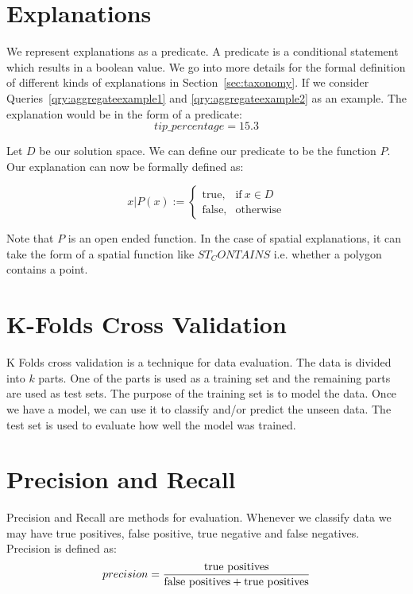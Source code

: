 \section{Explanations}
We represent explanations as a predicate. A predicate is a conditional statement which results in a boolean value. We go into more details for the formal definition of different kinds of explanations in Section~\ref{sec:taxonomy}. If we consider Queries~\ref{qry:aggregateexample1} and \ref{qry:aggregateexample2} as an example. The explanation would be in the form of a predicate:
$$tip\_percentage = 15.3$$

Let $D$ be our solution space. We can define our predicate to be the function $P$. Our explanation can now be formally defined as:

\begin{equation}
x|P(x):=
    \begin{cases}
      \text{true}, & \text{if}\ x \in D \\
      \text{false}, & \text{otherwise}
    \end{cases}
\end{equation}

Note that $P$ is an open ended function. In the case of spatial explanations, it can take the form of a spatial function like $ST_CONTAINS$ i.e. whether a polygon contains a point.

\section{K-Folds Cross Validation}
K Folds cross validation is a technique for data evaluation\citep{kohavi1995study,refaeilzadeh2009cross}. The data is divided into $k$ parts. One of the parts is used as a training set and the remaining parts are used as test sets. The purpose of the training set is to model the data. Once we have a model, we can use it to classify and/or predict the unseen data. The test set is used to evaluate how well the model was trained.

\section{Precision and Recall}
Precision and Recall are methods for evaluation\citep{olson2008advanced,powers2011evaluation}. Whenever we classify data we may have true positives, false positive, true negative and false negatives. Precision is defined as:
$$precision = \frac{\textnormal{true positives}}{\textnormal{false positives} + \textnormal{true positives}}$$

